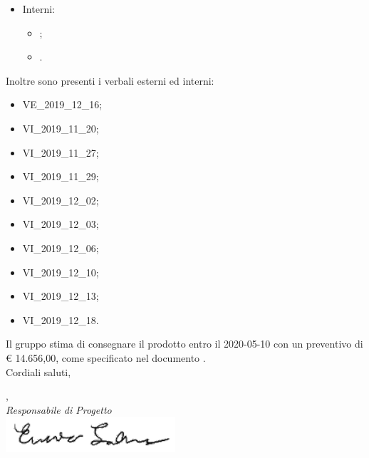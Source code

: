 \documentclass[12pt]{letter}
\begin{document}
\begin{letter}
\begin{itemize}
\begin{itemize}
            \item {};
            \item {}.
        \end{itemize}
        \item Interni:
        \begin{itemize}
            \item {};
            \item {}.
        \end{itemize}
    \end{itemize}
        Inoltre sono presenti i verbali esterni ed interni:
        \begin{itemize}
            \item VE\_2019\_12\_16;
            \item VI\_2019\_11\_20;
            \item VI\_2019\_11\_27;
            \item VI\_2019\_11\_29;
            \item VI\_2019\_12\_02;
            \item VI\_2019\_12\_03;
            \item VI\_2019\_12\_06;
            \item VI\_2019\_12\_10;
            \item VI\_2019\_12\_13;
            \item VI\_2019\_12\_18.
        \end{itemize}
        Il gruppo stima di consegnare il prodotto entro il 2020-05-10 con un preventivo di \euro{} 14.656,00, come specificato nel documento .\\
        Cordiali saluti,
        \closing{\SE{}, \\ \textit{Responsabile di Progetto}\\ \includegraphics[width=.6\linewidth, height=50px]{../DocumentazioneEsterna/PianoDiProgetto/sezioni/Firme/Enrico.png}}
        \vspace{10mm}
    \end{letter}
\end{document}
